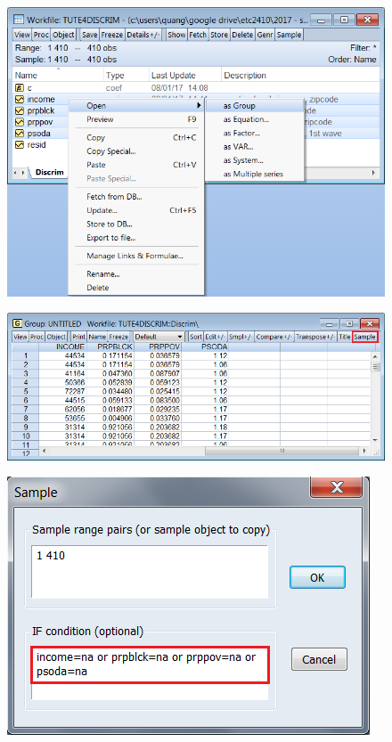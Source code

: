 \documentclass[12pt]{report}
\begin{document}
\begin{figure}[H]
	\centerline{\includegraphics{tute5_1}}
\end{figure}
\vspace{-\baselineskip}
\begin{figure}[H]
	\centerline{\includegraphics{tute5_2}}
\end{figure}
\vspace{-\baselineskip}
\begin{figure}[H]
	\centerline{\includegraphics{tute5_3}}
\end{figure}
\end{document}
